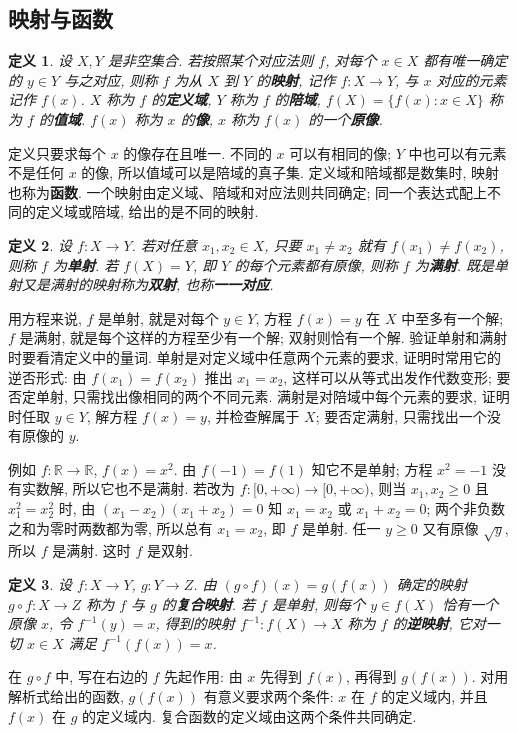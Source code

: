 \documentclass[UTF8,openany]{ctexbook}
\theoremstyle{chinesetextbook}
\newtheorem{definition}{定义}[section]
\begin{document}
\subsection{映射与函数}
\begin{definition}
设 $X,Y$ 是非空集合. 若按照某个对应法则 $f$, 对每个 $x\in X$ 都有唯一确定的 $y\in Y$ 与之对应, 则称 $f$ 为从 $X$ 到 $Y$ 的\textbf{映射}, 记作 $f:X\to Y$, 与 $x$ 对应的元素记作 $f(x)$. $X$ 称为 $f$ 的\textbf{定义域}, $Y$ 称为 $f$ 的\textbf{陪域}, $f(X)=\{f(x):x\in X\}$ 称为 $f$ 的\textbf{值域}. $f(x)$ 称为 $x$ 的\textbf{像}, $x$ 称为 $f(x)$ 的一个\textbf{原像}.
\end{definition}
定义只要求每个 $x$ 的像存在且唯一. 不同的 $x$ 可以有相同的像; $Y$ 中也可以有元素不是任何 $x$ 的像, 所以值域可以是陪域的真子集. 定义域和陪域都是数集时, 映射也称为\textbf{函数}. 一个映射由定义域、陪域和对应法则共同确定; 同一个表达式配上不同的定义域或陪域, 给出的是不同的映射.
\begin{definition}
设 $f:X\to Y$. 若对任意 $x_1,x_2\in X$, 只要 $x_1\ne x_2$ 就有 $f(x_1)\ne f(x_2)$, 则称 $f$ 为\textbf{单射}. 若 $f(X)=Y$, 即 $Y$ 的每个元素都有原像, 则称 $f$ 为\textbf{满射}. 既是单射又是满射的映射称为\textbf{双射}, 也称\textbf{一一对应}.
\end{definition}
用方程来说, $f$ 是单射, 就是对每个 $y\in Y$, 方程 $f(x)=y$ 在 $X$ 中至多有一个解; $f$ 是满射, 就是每个这样的方程至少有一个解; 双射则恰有一个解. 验证单射和满射时要看清定义中的量词. 单射是对定义域中任意两个元素的要求, 证明时常用它的逆否形式: 由 $f(x_1)=f(x_2)$ 推出 $x_1=x_2$, 这样可以从等式出发作代数变形; 要否定单射, 只需找出像相同的两个不同元素. 满射是对陪域中每个元素的要求, 证明时任取 $y\in Y$, 解方程 $f(x)=y$, 并检查解属于 $X$; 要否定满射, 只需找出一个没有原像的 $y$.

例如 $f:\mathbb R\to\mathbb R$, $f(x)=x^2$. 由 $f(-1)=f(1)$ 知它不是单射; 方程 $x^2=-1$ 没有实数解, 所以它也不是满射. 若改为 $f:[0,+\infty)\to[0,+\infty)$, 则当 $x_1,x_2\ge0$ 且 $x_1^2=x_2^2$ 时, 由 $(x_1-x_2)(x_1+x_2)=0$ 知 $x_1=x_2$ 或 $x_1+x_2=0$; 两个非负数之和为零时两数都为零, 所以总有 $x_1=x_2$, 即 $f$ 是单射. 任一 $y\ge0$ 又有原像 $\sqrt y$, 所以 $f$ 是满射. 这时 $f$ 是双射.
\begin{definition}
设 $f:X\to Y$, $g:Y\to Z$. 由 $(g\circ f)(x)=g(f(x))$ 确定的映射 $g\circ f:X\to Z$ 称为 $f$ 与 $g$ 的\textbf{复合映射}. 若 $f$ 是单射, 则每个 $y\in f(X)$ 恰有一个原像 $x$, 令 $f^{-1}(y)=x$, 得到的映射 $f^{-1}:f(X)\to X$ 称为 $f$ 的\textbf{逆映射}, 它对一切 $x\in X$ 满足 $f^{-1}(f(x))=x$.
\end{definition}
在 $g\circ f$ 中, 写在右边的 $f$ 先起作用: 由 $x$ 先得到 $f(x)$, 再得到 $g(f(x))$. 对用解析式给出的函数, $g(f(x))$ 有意义要求两个条件: $x$ 在 $f$ 的定义域内, 并且 $f(x)$ 在 $g$ 的定义域内. 复合函数的定义域由这两个条件共同确定.
\end{document}
